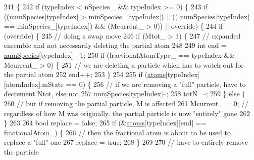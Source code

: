 \begin{DoxyCode}
241                                                                                    \{
242     \textcolor{keywordflow}{if} (typeIndex < nSpecies\_ && typeIndex >= 0) \{
243         \textcolor{keywordflow}{if} ((\hyperlink{classsim_system_a9eea865e6dc1cff377b1e79c4d9c23f0}{numSpecies}[typeIndex] > minSpecies\_[typeIndex]) || ((
      \hyperlink{classsim_system_a9eea865e6dc1cff377b1e79c4d9c23f0}{numSpecies}[typeIndex] == minSpecies\_[typeIndex]) && (Mcurrent\_ > 0)) || \textcolor{keyword}{override}) \{
244             \textcolor{keywordflow}{if} (\textcolor{keyword}{override}) \{
245                 \textcolor{comment}{// doing a swap move}
246                 \textcolor{keywordflow}{if} (Mtot\_ > 1) \{
247                     \textcolor{comment}{// expanded ensemble and not necessarily deleting the partial atom}
248 
249                     \textcolor{keywordtype}{int} end = \hyperlink{classsim_system_a9eea865e6dc1cff377b1e79c4d9c23f0}{numSpecies}[typeIndex] - 1;
250                     \textcolor{keywordflow}{if} (fractionalAtomType\_ == typeIndex && Mcurrent\_ > 0) \{
251                         \textcolor{comment}{// we are deleting a particle which has to watch out for the partial atom}
252                         end++;
253                     \}
254 
255                     \textcolor{keywordflow}{if} (\hyperlink{classsim_system_a90421b19082f7fb8fc23b7264b1161e4}{atoms}[typeIndex][atomIndex].mState == 0) \{
256                         \textcolor{comment}{// if we are removing a "full" particle, have to decrement Ntot, else not}
257                         \hyperlink{classsim_system_a9eea865e6dc1cff377b1e79c4d9c23f0}{numSpecies}[typeIndex]--;
258                         totN\_--;
259                     \} \textcolor{keywordflow}{else} \{
260                         \textcolor{comment}{// but if removing the partial particle, M is affected}
261                         Mcurrent\_ = 0; \textcolor{comment}{// regardless of how M was originally, the partial particle is now
       "entirely" gone}
262                     \}
263 
264                     \textcolor{keywordtype}{bool} replace = \textcolor{keyword}{false};
265                     \textcolor{keywordflow}{if} (&\hyperlink{classsim_system_a90421b19082f7fb8fc23b7264b1161e4}{atoms}[typeIndex][end] == fractionalAtom\_) \{
266                         \textcolor{comment}{// then the fractional atom is about to be used to replace a "full" one}
267                         replace = \textcolor{keyword}{true};
268                     \}
269 
270                     \textcolor{comment}{// have to entirely remove the particle}

\end{DoxyCode}
